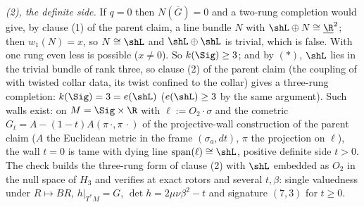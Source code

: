 \emph{(2), the definite side.} If $q = 0$ then $N(\overline G) = 0$ and a two-rung completion would give, by clause (1) of the parent claim, a line bundle $N$ with $\shL \oplus N \cong \underline{\R}^{2}$; then $w_1(N) = x$, so $N \cong \shL$ and $\shL \oplus \shL$ is trivial, which is false. With one rung even less is possible ($x \neq 0$). So $k(\Sig) \geq 3$; and by $(*)$, $\shL$ lies in the trivial bundle of rank three, so clause (2) of the parent claim (the coupling of  with twisted collar data, its twist confined to the collar) gives a three-rung completion: $k(\Sig) = 3 = e(\shL)$ ($e(\shL) \geq 3$ by the same argument). Such walls exist: on $M = \Sig \times \R$ with $\ell := O_2 \cdot \sigma$ and the cometric $G_t = A - (1 - t) A(\pi\,\cdot, \pi\,\cdot)$ of the projective-wall construction of the parent claim ($A$ the Euclidean metric in the frame $(\sigma_a, dt)$, $\pi$ the projection on $\ell$), the wall $t = 0$ is tame with dying line $\operatorname{span}(\ell) \cong \shL$, positive definite side $t > 0$. The check builds the three-rung form of clause (2) with $\shL$ embedded as $O_2$ in the null space of $H_3$ and verifies at exact rotors and several $t, \beta$: single valuedness under $R \mapsto BR$, $h|_{T^*M} = G$, $\det h = 2\mu\nu\beta^{2} - t$ and signature $(7,3)$ for $t \geq 0$.

